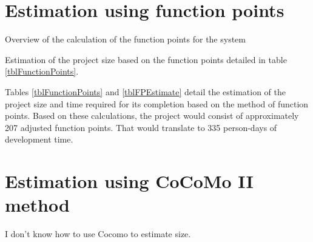 \section{Estimation using function points}

\begin{table}[hbtp]
\centering

\caption{Overview of the calculation of the function points for the system}
\label{tblFunctionPoints}
\end{table}

\begin{table}[hbtp]
\centering

\caption{Estimation of the project size based on the function points detailed in table \ref{tblFunctionPoints}.}
\label{tblFPEstimate}
\end{table}

Tables \ref{tblFunctionPoints} and \ref{tblFPEstimate} detail the estimation of the project size and time required for its completion based on the method of function points. Based on these calculations, the project would consist of approximately 207 adjusted function points. That would translate to 335 person-days of development time.

\section{Estimation using CoCoMo II method}

I don't know how to use Cocomo to estimate size.

